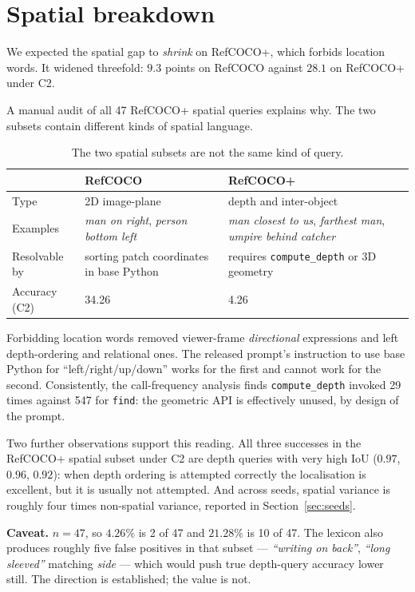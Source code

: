 \documentclass[12pt,a4paper,oneside]{report}
\begin{document}
\section{Spatial breakdown}
\label{sec:audit}

We expected the spatial gap to \emph{shrink} on RefCOCO+, which forbids location words.
It widened threefold: $9.3$ points on RefCOCO against $28.1$ on RefCOCO+ under C2.

A manual audit of all 47 RefCOCO+ spatial queries explains why. The two subsets contain
different kinds of spatial language.

\begin{table}[htbp]\centering
\caption{The two spatial subsets are not the same kind of query.}
\label{tab:audit}
\begin{tabular}{@{}p{}p{}p{}@{}}
\toprule
& \textbf{RefCOCO} & \textbf{RefCOCO+} \\
\midrule
Type & 2D image-plane & depth and inter-object \\
Examples & \emph{man on right}, \emph{person bottom left} &
\emph{man closest to us}, \emph{farthest man}, \emph{umpire behind catcher} \\
Resolvable by & sorting patch coordinates in base Python &
requires \texttt{compute\_depth} or 3D geometry \\
Accuracy (C2) & 34.26 & 4.26 \\
\bottomrule
\end{tabular}
\end{table}

Forbidding location words removed viewer-frame \emph{directional} expressions and left
depth-ordering and relational ones. The released prompt's instruction to use base Python
for ``left/right/up/down'' works for the first and cannot work for the second.
Consistently, the call-frequency analysis finds \texttt{compute\_depth} invoked 29 times
against 547 for \texttt{find}: the geometric API is effectively unused, by design of the
prompt.

Two further observations support this reading. All three successes in the RefCOCO+
spatial subset under C2 are depth queries with very high IoU ($0.97$, $0.96$, $0.92$):
when depth ordering is attempted correctly the localisation is excellent, but it is
usually not attempted. And across seeds, spatial variance is roughly four times
non-spatial variance, reported in Section~\ref{sec:seeds}.

\textbf{Caveat.} $n = 47$, so $4.26\%$ is 2 of 47 and $21.28\%$ is 10 of 47. The lexicon
also produces roughly five false positives in that subset --- \emph{``writing on back''},
\emph{``long sleeved''} matching \emph{side} --- which would push true depth-query
accuracy lower still. The direction is established; the value is not.
\end{document}
